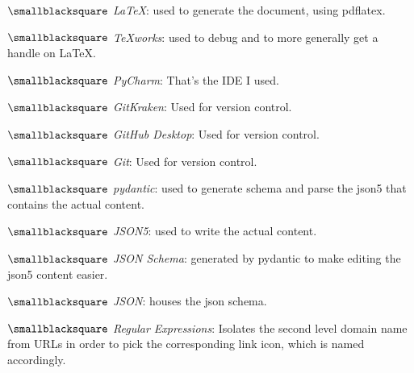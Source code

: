 \documentclass[10mm,letterpaper,notitlepage]{article}
\begin{document}
{{								$\smallblacksquare$ \textit{LaTeX}: used to generate the document, using pdflatex.
								
								$\smallblacksquare$ \textit{TeXworks}: used to debug and to more generally get a handle on LaTeX.
								
								$\smallblacksquare$ \textit{PyCharm}: That's the IDE I used.
								
								$\smallblacksquare$ \textit{GitKraken}: Used for version control.
								
								$\smallblacksquare$ \textit{GitHub Desktop}: Used for version control.
								
								$\smallblacksquare$ \textit{Git}: Used for version control.
								
								$\smallblacksquare$ \textit{pydantic}: used to generate schema and parse the json5 that contains the actual content.
								
								$\smallblacksquare$ \textit{JSON5}: used to write the actual content.
								
								$\smallblacksquare$ \textit{JSON Schema}: generated by pydantic to make editing the json5 content easier.
								
								$\smallblacksquare$ \textit{JSON}: houses the json schema.
								
								$\smallblacksquare$ \textit{Regular Expressions}: Isolates the second level domain name from URLs in order to pick the corresponding link icon, which is named accordingly.
								
}}
\end{document}
